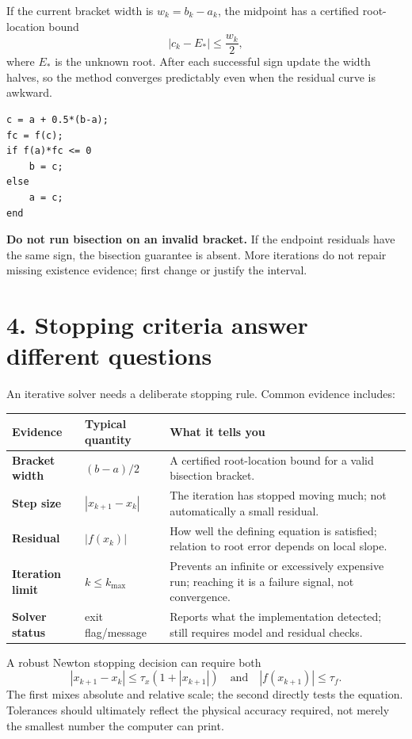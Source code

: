 \documentclass[11pt,a4paper]{article}
\begin{document}
If the current bracket width is $w_k=b_k-a_k$, the midpoint has a certified root-location bound
\begin{equation}
 |c_k-E_*|\le\frac{w_k}{2},
\end{equation}
where $E_*$ is the unknown root. After each successful sign update the width halves, so the method converges predictably even when the residual curve is awkward.

\begin{lstlisting}[style=matlabstyle,caption={Core bisection logic for one iteration.}]
c = a + 0.5*(b-a);
fc = f(c);
if f(a)*fc <= 0
    b = c;
else
    a = c;
end
\end{lstlisting}

\begin{keybox}
\textbf{Do not run bisection on an invalid bracket.} If the endpoint residuals have the same sign, the bisection guarantee is absent. More iterations do not repair missing existence evidence; first change or justify the interval.
\end{keybox}

\section*{4. Stopping criteria answer different questions}
An iterative solver needs a deliberate stopping rule. Common evidence includes:
\begin{center}
\begin{tabular}{>{\bfseries}p{31mm}p{54mm}p{76mm}}
\toprule
Evidence & Typical quantity & What it tells you \\
\midrule
Bracket width & $(b-a)/2$ & A certified root-location bound for a valid bisection bracket. \\
Step size & $|x_{k+1}-x_k|$ & The iteration has stopped moving much; not automatically a small residual. \\
Residual & $|f(x_k)|$ & How well the defining equation is satisfied; relation to root error depends on local slope. \\
Iteration limit & $k\le k_{\max}$ & Prevents an infinite or excessively expensive run; reaching it is a failure signal, not convergence. \\
Solver status & exit flag/message & Reports what the implementation detected; still requires model and residual checks. \\
\bottomrule
\end{tabular}
\end{center}
A robust Newton stopping decision can require both
\begin{equation}
 |x_{k+1}-x_k|\le \tau_x(1+|x_{k+1}|)
 \quad\text{and}\quad
 |f(x_{k+1})|\le\tau_f.
\end{equation}
The first mixes absolute and relative scale; the second directly tests the equation. Tolerances should ultimately reflect the physical accuracy required, not merely the smallest number the computer can print.
\end{document}
